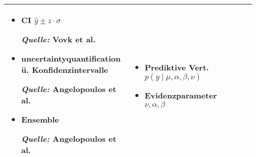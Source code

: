\begin{otherlanguage}{ngerman}
\begin{table}[!htpb]
\begin{tabularx}{\textwidth}{|>{\centering\arraybackslash}l|X|X|X|}
    \begin{minipage}[t]{\linewidth}
    \vspace{0.3em}
    \begin{itemize}[leftmargin=*, label={}, itemsep=0.125em, topsep=0em, parsep=0em]
        \item CI \( \hat{y} \pm z \cdot \sigma \) \par
        \begin{scriptsize}\textit{Quelle:} Vovk et al. \parencite*[S.~4–5]{vovk2005algorithmic}\end{scriptsize}
        \item \gls{uncertaintyquantification} ü. Konfidenzintervalle \par
        \begin{scriptsize}\textit{Quelle:} Angelopoulos et al. \parencite*{angelopoulos2021gentle}\end{scriptsize}
        \item Ensemble \par
        \begin{scriptsize}\textit{Quelle:} Angelopoulos et al. \parencite*{angelopoulos2021gentle}\end{scriptsize}
    \end{itemize}
    \vspace{0.3em}
    \end{minipage} &

    \begin{minipage}[t]{\linewidth}
    \vspace{0.3em}
    \begin{itemize}[leftmargin=*, label={}, itemsep=0.125em, topsep=0em, parsep=0em]
        \item Prediktive Vert. \( p(y \mid \mu, \alpha, \beta, \nu) \)
        \item Evidenzparameter \( \nu, \alpha, \beta \)
    \end{itemize}
    \vspace{0.3em}
    \end{minipage} \\
    \hline


\end{tabularx}
\end{table}
\end{otherlanguage}
